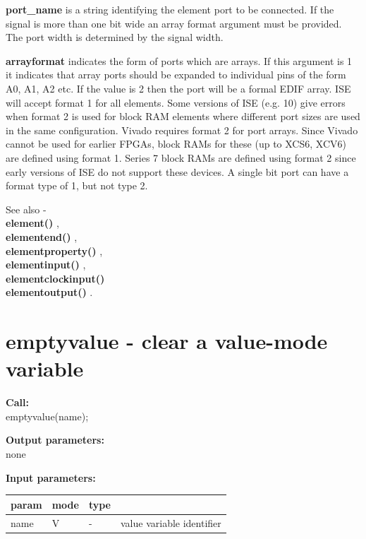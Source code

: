         {\bf port\_name} is a string identifying the element port to be connected. If
        the signal is more than one bit wide an array format argument must be
        provided. The port width is determined by the signal width.

        
        {\bf arrayformat} indicates the form of ports which are arrays.
        If this argument is 1 it indicates that array ports should be
        expanded to individual pins of the form A0, A1, A2 etc. If the value
        is 2 then the port will be a formal EDIF array. ISE will accept format
        1 for all elements. Some versions of ISE (e.g. 10) give errors when
        format 2 is used for block RAM elements where different port sizes
        are used in the same configuration. Vivado requires format 2 for port
        arrays. Since Vivado cannot be used for earlier FPGAs, block RAMs for
        these (up to XCS6, XCV6) are defined using format 1. Series 7 block RAMs
        are defined using format 2 since early versions of ISE do not support
        these devices. A single bit port can have a format type of 1, but not
        type 2.

        See also - \\
        {\bf element()} , \\
        {\bf elementend()} , \\
        {\bf elementproperty()} , \\
        {\bf elementinput()} , \\
        {\bf elementclockinput()}  \\
        {\bf elementoutput()} .





    \section{emptyvalue - clear a value-mode variable}\label{sec:ipemptyvalue}
        
        {\bf Call:} \\
        emptyvalue(name);
        
        {\bf Output parameters:} \\
        none
        
        {\bf Input parameters:} \\
        \begin{tabular}{| l | l | l | l |}
        \hline
        param  & mode     & type  & \\
        \hline \hline
        name   & V        & -     & value variable identifier \\ \hline
        \end{tabular}
        
